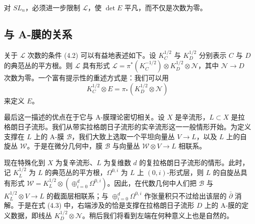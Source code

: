 \documentclass[11pt,a4paper]{article}
\begin{document}

对 $SL_n$，必须进一步限制 $\mathcal{L}$，使 $\det E$ 平凡，而不仅是次数为零。

\subsection{与 A-膜的关系}

关于 $\mathcal{L}$ 次数的条件 (4.2) 可以有益地表述如下。设 $K_C^{1/2}$ 与 $K_D^{1/2}$ 分别表示 $C$ 与 $D$ 的典范丛的平方根。则 $\mathcal{L}$ 具有形式 $\mathcal{L}=\pi^*(K_C^{-1/2})\otimes K_D^{1/2}\otimes\mathcal{N}$，其中 $\mathcal{N}\to D$ 次数为零。一个富有提示性的重述方式是：我们可以用
\begin{equation}\tag{4.3}
K_C^{1/2}\otimes E=\pi_*(K_D^{1/2}\otimes\mathcal{N})
\end{equation}
来定义 $E$。

最后这一描述的优点在于它与 A-膜理论密切相关。设 $X$ 是辛流形，$L\subset X$ 是拉格朗日子流形。我们从带实拉格朗日子流形的实辛流形这一一般情形开始。为定义支撑在 $L$ 上的 A-膜 $\mathcal{B}$，我们大致上选取一个平坦向量丛
$V\to L$，以及 $L$ 上的自旋丛 $\mathcal{W}$。于是在微分几何中，膜 $\mathcal{B}$ 与向量丛 $\mathcal{W}\otimes V\to L$ 相联系。

现在特殊化到 $X$ 为复辛流形、$L$ 为复维数 $d$ 的复拉格朗日子流形的情形。此时，记 $K_L^{1/2}$ 为 $L$ 的典范丛的平方根，$\Omega^{0,i}$ 为 $L$ 上 $(0,i)$-形式层，则 $L$ 的自旋丛具有形式 $\mathcal{W}=K_L^{1/2}\otimes(\oplus_{i=0}^{d}\Omega^{0,i})$。因此，在代数几何中人们把 $\mathcal{B}$ 与 $K_L^{1/2}\otimes V\to L$ 的截面层相联系；与 $\oplus_{i=0}^{d}\Omega^{0,i}$ 作张量积只不过给出该层的 $\bar\partial$ 消解。于是在式 (4.3) 中，右端涉及的恰是支撑在拉格朗日子流形 $D$ 上的 A-膜的定义数据，即线丛 $K_D^{1/2}\otimes\mathcal{N}$。稍后我们将看到左端在何种意义上也是自然的。

\end{document}
